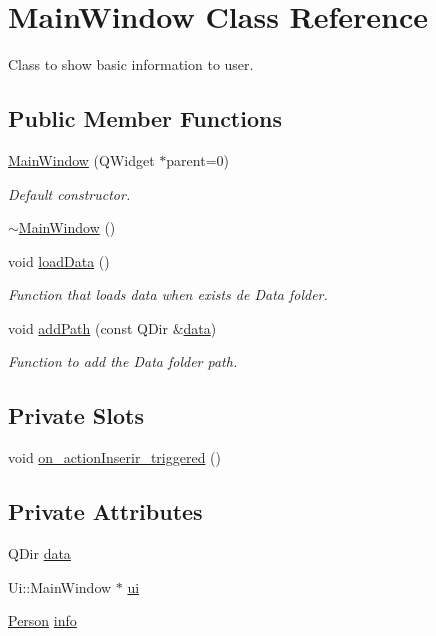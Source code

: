 \hypertarget{class_main_window}{\section{Main\+Window Class Reference}
\label{class_main_window}
}


Class to show basic information to user.  


\subsection*{Public Member Functions}
\begin{DoxyCompactItemize}
\item 
\hyperlink{class_main_window_a8b244be8b7b7db1b08de2a2acb9409db}{Main\+Window} (Q\+Widget $\ast$parent=0)
\begin{DoxyCompactList}\small\item\em Default constructor. \end{DoxyCompactList}\item 
\hyperlink{class_main_window_ae98d00a93bc118200eeef9f9bba1dba7}{$\sim$\+Main\+Window} ()
\item 
void \hyperlink{class_main_window_a6906cd747941813c6da899b18d881473}{load\+Data} ()
\begin{DoxyCompactList}\small\item\em Function that loads data when exists de {\itshape Data} folder. \end{DoxyCompactList}\item 
void \hyperlink{class_main_window_a44d044deed1ddca8952f59554705e28d}{add\+Path} (const Q\+Dir \&\hyperlink{class_main_window_a1dc35bda22acc11636be809539ab73d9}{data})
\begin{DoxyCompactList}\small\item\em Function to add the {\itshape Data} folder path. \end{DoxyCompactList}\end{DoxyCompactItemize}
\subsection*{Private Slots}
\begin{DoxyCompactItemize}
\item 
void \hyperlink{class_main_window_a308a629f351133027a3602d27099cb7c}{on\+\_\+action\+Inserir\+\_\+triggered} ()
\end{DoxyCompactItemize}
\subsection*{Private Attributes}
\begin{DoxyCompactItemize}
\item 
Q\+Dir \hyperlink{class_main_window_a1dc35bda22acc11636be809539ab73d9}{data}
\item 
Ui\+::\+Main\+Window $\ast$ \hyperlink{class_main_window_a35466a70ed47252a0191168126a352a5}{ui}
\item 
\hyperlink{class_person}{Person} \hyperlink{class_main_window_a2d1f101eed410e692b5db9b7226174bf}{info}
\end{DoxyCompactItemize}


